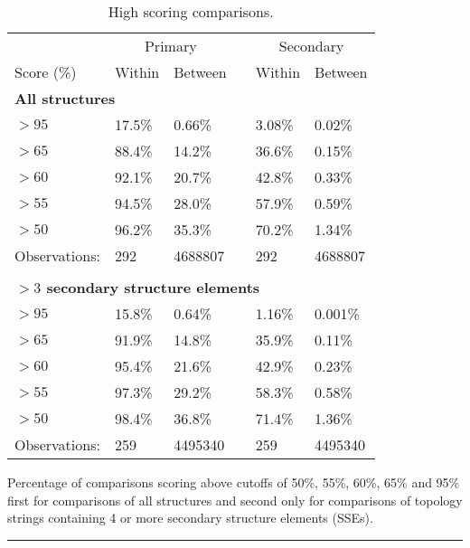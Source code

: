 \documentclass{article}
\begin{document}
\begin{table}
\caption{\label{tab:scores} High scoring comparisons.}
\begin{center}
\begin{tabularx}{\linewidth}{Xlllll}\hline
              & \multicolumn{2}{c}{Primary} & & \multicolumn{2}{c}{Secondary} \\ \cline{2-3}\cline{5-6}
Score (\%)    & Within    & Between         & & Within    & Between           \\ \hline
\multicolumn{6}{l}{\bfseries All structures} \\
$>95$         & 17.5\%    & 0.66\%          & & 3.08\%    & 0.02\%            \\
$>65$         & 88.4\%    & 14.2\%          & & 36.6\%    & 0.15\%            \\ 
$>60$         & 92.1\%    & 20.7\%          & & 42.8\%    & 0.33\%            \\ 
$>55$         & 94.5\%    & 28.0\%          & & 57.9\%    & 0.59\%            \\ 
$>50$         & 96.2\%    & 35.3\%          & & 70.2\%    & 1.34\%            \\ 
Observations: & 292       & 4688807         & & 292       & 4688807           \\
              &           &                 & &           &                   \\
\multicolumn{6}{l}{\bfseries $>3$ secondary structure elements} \\
$>95$         & 15.8\%    & 0.64\%          & & 1.16\%    & 0.001\%           \\
$>65$         & 91.9\%    & 14.8\%          & & 35.9\%    & 0.11\%            \\ 
$>60$         & 95.4\%    & 21.6\%          & & 42.9\%    & 0.23\%            \\ 
$>55$         & 97.3\%    & 29.2\%          & & 58.3\%    & 0.58\%            \\ 
$>50$         & 98.4\%    & 36.8\%          & & 71.4\%    & 1.36\%            \\ 
Observations: & 259       & 4495340         & & 259       & 4495340           \\ \hline
\end{tabularx}
\end{center}
Percentage of comparisons scoring above cutoffs of 50\%, 55\%, 60\%,
65\% and 95\% first for comparisons of all structures and second only
for comparisons of topology strings containing 4 or more secondary
structure elements (SSEs).  \hrule
\end{table}
\end{document}
